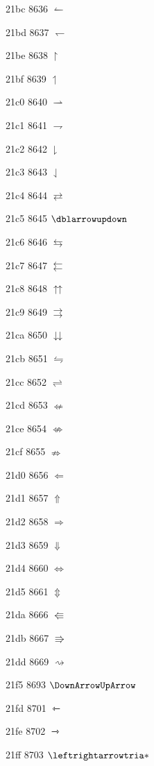 \documentclass[11pt]{article}
\begin{document}
21bc 8636 \ensuremath{\leftharpoonup}

21bd 8637 \ensuremath{\leftharpoondown}

21be 8638 \ensuremath{\upharpoonright}

21bf 8639 \ensuremath{\upharpoonleft}

21c0 8640 \ensuremath{\rightharpoonup}

21c1 8641 \ensuremath{\rightharpoondown}

21c2 8642 \ensuremath{\downharpoonright}

21c3 8643 \ensuremath{\downharpoonleft}

21c4 8644 \ensuremath{\rightleftarrows}

21c5 8645 \ensuremath{\dblarrowupdown}

21c6 8646 \ensuremath{\leftrightarrows}

21c7 8647 \ensuremath{\leftleftarrows}

21c8 8648 \ensuremath{\upuparrows}

21c9 8649 \ensuremath{\rightrightarrows}

21ca 8650 \ensuremath{\downdownarrows}

21cb 8651 \ensuremath{\leftrightharpoons}

21cc 8652 \ensuremath{\rightleftharpoons}

21cd 8653 \ensuremath{\nLeftarrow}

21ce 8654 \ensuremath{\nLeftrightarrow}

21cf 8655 \ensuremath{\nRightarrow}

21d0 8656 \ensuremath{\Leftarrow}

21d1 8657 \ensuremath{\Uparrow}

21d2 8658 \ensuremath{\Rightarrow}

21d3 8659 \ensuremath{\Downarrow}

21d4 8660 \ensuremath{\Leftrightarrow}

21d5 8661 \ensuremath{\Updownarrow}

21da 8666 \ensuremath{\Lleftarrow}

21db 8667 \ensuremath{\Rrightarrow}

21dd 8669 \ensuremath{\rightsquigarrow}

21f5 8693 \ensuremath{\DownArrowUpArrow}

21fd 8701 \ensuremath{\leftarrowtriangle}

21fe 8702 \ensuremath{\rightarrowtriangle}

21ff 8703 \ensuremath{\leftrightarrowtria*}
\end{document}
